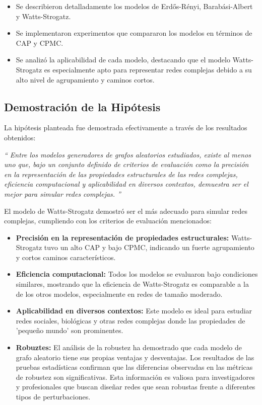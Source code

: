 \begin{itemize}
    \item Se describieron detalladamente los modelos de Erdős-Rényi, Barabási-Albert y Watts-Strogatz.
    \item Se implementaron experimentos que compararon los modelos en términos de CAP y CPMC.
    \item Se analizó la aplicabilidad de cada modelo, destacando que el modelo Watts-Strogatz es especialmente apto para representar redes complejas debido a su alto nivel de agrupamiento y caminos cortos.
\end{itemize}



\subsection{Demostración de la Hipótesis}

La hipótesis planteada fue demostrada efectivamente a través de los resultados obtenidos:

\textit{``
Entre los modelos generadores de grafos aleatorios estudiados, existe al menos uno que,
bajo un conjunto definido de criterios de evaluación como la precisión en la representación de las propiedades 
estructurales de las redes complejas, eficiencia computacional y aplicabilidad en diversos contextos, demuestra ser 
el mejor para simular redes complejas.
''}

El modelo de Watts-Strogatz demostró ser el más adecuado para simular redes complejas, cumpliendo con los criterios de evaluación mencionados:
\begin{itemize}
    \item \textbf{Precisión en la representación de propiedades estructurales:} Watts-Strogatz tuvo un alto CAP y bajo CPMC, indicando un fuerte agrupamiento y cortos caminos característicos.
    \item \textbf{Eficiencia computacional:} Todos los modelos se evaluaron bajo condiciones similares, mostrando que la eficiencia de Watts-Strogatz es comparable a la de los otros modelos, especialmente en redes de tamaño moderado.
    \item \textbf{Aplicabilidad en diversos contextos:} Este modelo es ideal para estudiar redes sociales, biológicas y otras redes complejas donde las propiedades de 'pequeño mundo' son prominentes.
    \item \textbf{Robuztes:} El análisis de la robustez ha demostrado que cada modelo de grafo aleatorio tiene sus propias ventajas y desventajas. Los resultados de las pruebas estadísticas confirman que las diferencias observadas en las métricas de robustez son significativas. Esta información es valiosa para investigadores y profesionales que buscan diseñar redes que sean robustas frente a diferentes tipos de perturbaciones.
\end{itemize}

